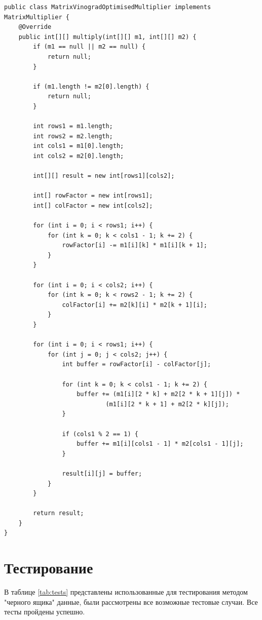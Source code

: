 \documentclass[12pt]{report}
\begin{document}
    \begin{lstlisting}[caption=Оптимизированный алгоритм Копперсмита-Винограда, label={lst:optVinograd}, justification=RaggedRight]
public class MatrixVinogradOptimisedMultiplier implements MatrixMultiplier {
    @Override
    public int[][] multiply(int[][] m1, int[][] m2) {
        if (m1 == null || m2 == null) {
            return null;
        }

        if (m1.length != m2[0].length) {
            return null;
        }

        int rows1 = m1.length;
        int rows2 = m2.length;
        int cols1 = m1[0].length;
        int cols2 = m2[0].length;

        int[][] result = new int[rows1][cols2];

        int[] rowFactor = new int[rows1];
        int[] colFactor = new int[cols2];

        for (int i = 0; i < rows1; i++) {
            for (int k = 0; k < cols1 - 1; k += 2) {
                rowFactor[i] -= m1[i][k] * m1[i][k + 1];
            }
        }

        for (int i = 0; i < cols2; i++) {
            for (int k = 0; k < rows2 - 1; k += 2) {
                colFactor[i] += m2[k][i] * m2[k + 1][i];
            }
        }

        for (int i = 0; i < rows1; i++) {
            for (int j = 0; j < cols2; j++) {
                int buffer = rowFactor[i] - colFactor[j];

                for (int k = 0; k < cols1 - 1; k += 2) {
                    buffer += (m1[i][2 * k] + m2[2 * k + 1][j]) *
                            (m1[i][2 * k + 1] + m2[2 * k][j]);
                }

                if (cols1 % 2 == 1) {
                    buffer += m1[i][cols1 - 1] * m2[cols1 - 1][j];
                }

                result[i][j] = buffer;
            }
        }

        return result;
    }
}
    \end{lstlisting}


    \section{Тестирование}
    В таблице \ref{tab:tests} представлены использованные для тестирования методом "черного ящика" данные,
    были рассмотрены все возможные тестовые случаи. Все тесты пройдены успешно.
\end{document}
